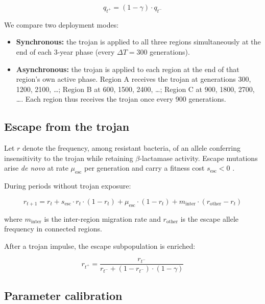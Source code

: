 \documentclass[12pt,a4paper]{article}
\begin{document}
\begin{equation}
q_{t^+} = (1 - \gamma) \cdot q_{t^-}
\label{eq:trojan_q}
\end{equation}

We compare two deployment modes:

\begin{itemize}
    \item \textbf{Synchronous:} the trojan is applied to all three regions simultaneously at the end of each 3-year phase (every $\Delta T = 300$ generations).
    \item \textbf{Asynchronous:} the trojan is applied to each region at the end of that region's own active phase. Region A receives the trojan at generations 300, 1200, 2100, \dots; Region B at 600, 1500, 2400, \dots; Region C at 900, 1800, 2700, \dots. Each region thus receives the trojan once every 900 generations.
\end{itemize}

\subsection{Escape from the trojan}

Let $r$ denote the frequency, among resistant bacteria, of an allele conferring insensitivity to the trojan while retaining $\beta$-lactamase activity. Escape mutations arise \textit{de novo} at rate $\mu_{\text{esc}}$ per generation and carry a fitness cost $s_{\text{esc}} < 0$ \cite{wang2002, jacquier2013}.

During periods without trojan exposure:

\begin{equation}
r_{t+1} = r_t + s_{\text{esc}} \cdot r_t \cdot (1 - r_t) + \mu_{\text{esc}} \cdot (1 - r_t) + m_{\text{inter}} \cdot (r_{\text{other}} - r_t)
\label{eq:r_baseline}
\end{equation}

where $m_{\text{inter}}$ is the inter-region migration rate and $r_{\text{other}}$ is the escape allele frequency in connected regions.

After a trojan impulse, the escape subpopulation is enriched:

\begin{equation}
r_{t^+} = \frac{r_{t^-}}{r_{t^-} + (1 - r_{t^-}) \cdot (1 - \gamma)}
\label{eq:trojan_r}
\end{equation}

\subsection{Parameter calibration}
\end{document}
